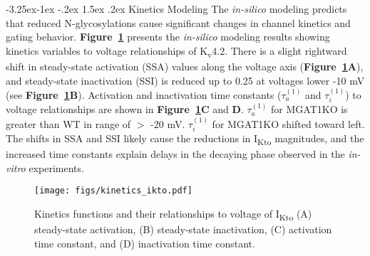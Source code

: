 \documentclass[11pt]{article}
\makeatletter
\renewcommand\subsection{\@startsection{subsection}{2}{\z@}%
                                     {-3.25ex\@plus -1ex \@minus -.2ex}%
                                     {1.5ex \@plus .2ex}%
                                     {\normalfont\fontfamily{phv}\fontsize{14}{17}\bfseries}}
\providecommand{\DIFadd}[1]{{\protect\color{blue}\uwave{#1}}} %
\providecommand{\DIFaddbegin}{} %
\providecommand{\DIFaddend}{} %
\newcommand{\DIFaddincludegraphics}[2][]{{\color{blue}\fbox{\DIFOincludegraphics[#1]{#2}}}} %
\DeclareRobustCommand{\DIFaddbegin}{\DIFOaddbegin \let\includegraphics\DIFaddincludegraphics} %
\DeclareRobustCommand{\DIFaddend}{\DIFOaddend \let\includegraphics\DIFOincludegraphics} %
\makeatother
\begin{document}
\subsection{Kinetics Modeling} \label{s:results.kinetics}
The \textit{in-silico} modeling predicts that reduced N-glycosylations cause significant changes in channel kinetics and gating behavior. \textbf{Figure~\ref{fig:kinetics_ikto}} presents the \textit{in-silico} modeling results showing kinetics variables to voltage relationships of K\textsubscript{v}4.2. There is a \DIFaddbegin \DIFadd{very }\DIFaddend slight rightward shift in steady-state activation (SSA) values along the voltage axis (\textbf{Figure~\ref{fig:kinetics_ikto}A}), and steady-state inactivation (SSI) is reduced up to 0.25 at voltages lower -10 mV (see \textbf{Figure~\ref{fig:kinetics_ikto}B}). Activation and inactivation time constants ($\tau_{a}^{(1)}$ and $\tau_{i}^{(1)}$) to voltage relationships are shown in \textbf{Figure~\ref{fig:kinetics_ikto}C} and \textbf{D}. $\tau_{a}^{(1)}$ for MGAT1KO is greater than WT in range of $>$ -20 mV. $\tau_{i}^{(1)}$ for MGAT1KO shifted toward left. The shifts in SSA and SSI likely cause the reductions in I\textsubscript{Kto} magnitudes, and the increased time constants explain delays in the decaying phase observed in the \textit{in-vitro} experiments.
\begin{figure}[!ht]
    \centering
    \texttt{[image: figs/kinetics\_ikto.pdf]}
    \caption{Kinetics functions and their relationships to voltage of I\textsubscript{Kto} (A) steady-state activation, (B) steady-state inactivation, (C) activation time constant, and (D) inactivation time constant.}
    \label{fig:kinetics_ikto}
\end{figure}
\end{document}
